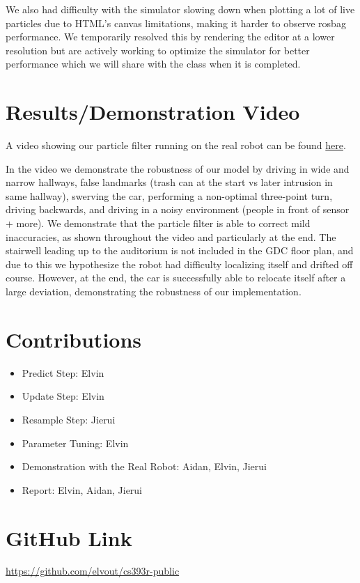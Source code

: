 \documentclass[11pt]{article}
\begin{document}
We also had difficulty with the simulator slowing down when plotting a lot of
live particles due to HTML's canvas limitations, making it harder to observe
rosbag performance. We temporarily resolved this by rendering the editor at a
lower resolution but are actively working to optimize the simulator for better
performance which we will share with the class when it is completed.

\section{Results/Demonstration Video}

A video showing our particle filter running on the real robot can be found
\href{https://drive.google.com/file/d/1xbL8haRyl_F6Kn7htrOQPeWww6VWr7wj/view?usp=sharing}{here}.

In the video we demonstrate the robustness of our model by driving in wide and
narrow hallways, false landmarks (trash can at the start vs later intrusion in
same hallway), swerving the car, performing a non-optimal three-point turn,
driving backwards, and driving in a noisy environment (people in front of sensor
+ more). We demonstrate that the particle filter is able to correct mild
inaccuracies, as shown throughout the video and particularly at the end. The
stairwell leading up to the auditorium is not included in the GDC floor plan,
and due to this we hypothesize the robot had difficulty localizing itself and
drifted off course. However, at the end, the car is successfully able to
relocate itself after a large deviation, demonstrating the robustness of our
implementation.

\section{Contributions}

\begin{itemize}
    \setlength\itemsep{0pt}
    \item Predict Step: Elvin
    \item Update Step: Elvin
    \item Resample Step: Jierui
    \item Parameter Tuning: Elvin
    \item Demonstration with the Real Robot: Aidan, Elvin, Jierui
    \item Report: Elvin, Aidan, Jierui
\end{itemize}

\section{GitHub Link}

\href{https://github.com/elvout/cs393r-public}{https://github.com/elvout/cs393r-public}
\end{document}
